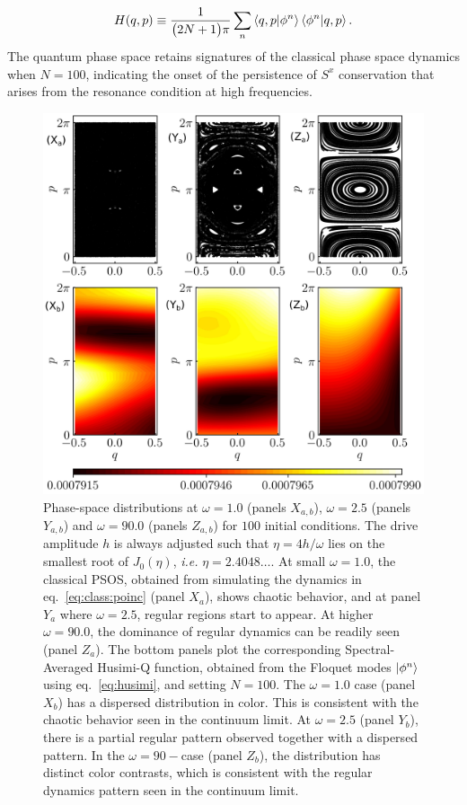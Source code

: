\documentclass[%
reprint,
superscriptaddress,
amsmath,amssymb,
aps,
prb,
showkeys,
]{revtex4-2}
\begin{document}
\begin{equation}
	H(q,p)\equiv \frac{1}{\big(2N+1\big)\pi}\sum_n \ip{q,p}{\phi^n}\ip{\phi^n}{q,p}.
	\label{eq:husimi}
\end{equation}
The quantum phase space retains signatures of the classical phase space dynamics when $N=100$, indicating the onset of the persistence of $S^x$ conservation that arises from the resonance condition at high frequencies. 
\begin{figure}[t!]
	\centering
	\includegraphics[width = 9.0 cm]{lmg_poincare.jpeg}
	\caption{Phase-space distributions at $\omega=1.0$ (panels $X_{a,b}$), $\omega=2.5$ (panels $Y_{a,b}$) and $\omega=90.0$ (panels $Z_{a,b}$) for $100$ initial conditions. The drive amplitude $h$ is always adjusted such that $\eta=4h/\omega$ lies on the smallest root of $J_0(\eta)$, \textit{i.e.} $\eta=2.4048\dots$. At small $\omega=1.0$, the classical PSOS, obtained from simulating the dynamics in eq.~\ref{eq:class:poinc} (panel $X_{a}$),  shows chaotic behavior, and at panel $Y_{a}$ where $\omega = 2.5$, regular regions start to appear. At higher $\omega = 90.0$, the dominance of regular dynamics can be readily seen (panel $Z_{a}$). The bottom panels plot the corresponding Spectral-Averaged Husimi-Q function, obtained from the Floquet modes $\ket{\phi^n}$ using eq.~\ref{eq:husimi}, and setting $N=100$. The $\omega=1.0$ case (panel $X_{b}$) has a dispersed distribution in color. This is consistent with the chaotic behavior seen in the continuum limit. At $\omega = 2.5$ (panel $Y_{b}$), there is a partial regular pattern observed together with a dispersed pattern. In the $\omega=90-$case (panel $Z_{b}$), the distribution has distinct color contrasts, which is consistent with the regular dynamics pattern seen in the continuum limit.}
	\label{fig:classical_lipkin}
\end{figure}
\end{document}
